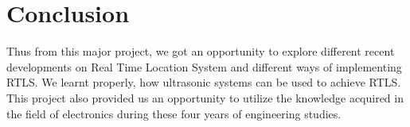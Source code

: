 \section{Conclusion}
Thus from this major project, we got an opportunity to explore different recent developments on Real Time Location System and different ways of implementing RTLS. We learnt properly, how ultrasonic systems can be used to achieve RTLS. This project also provided us an opportunity to utilize the knowledge acquired in the field of electronics during these four years of engineering studies. 
